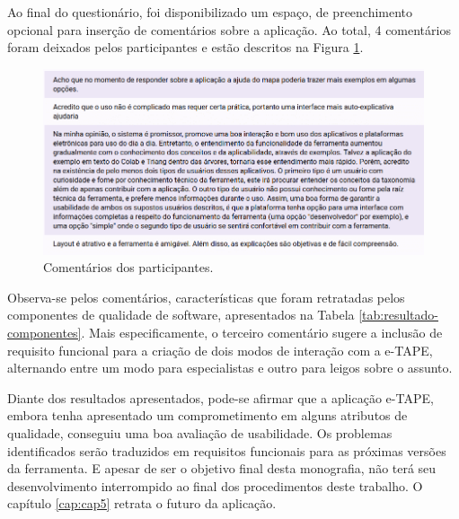 \par


Ao final do questionário, foi disponibilizado um espaço, de preenchimento opcional para  inserção de comentários sobre a aplicação. Ao total, 
4 comentários foram deixados pelos participantes e estão descritos na Figura \ref{fig:coments}.

\begin{figure}[!ht]
    \centering
    \includegraphics[scale=0.5]{./figuras/coments.png}
    \caption{Comentários dos participantes.}
    \label{fig:coments}
\end{figure}

\par
Observa-se pelos comentários, características que foram retratadas pelos componentes de qualidade de software, apresentados na Tabela \ref{tab:resultado-componentes}.
Mais especificamente, o terceiro comentário sugere a inclusão de requisito funcional para a criação de dois modos de interação com a e-TAPE, alternando entre um
modo para especialistas e outro para leigos sobre o assunto.

\par 
Diante dos resultados apresentados, pode-se afirmar que a aplicação e-TAPE, embora tenha apresentado um comprometimento em alguns atributos de qualidade,  conseguiu uma boa avaliação de usabilidade. Os problemas identificados serão traduzidos em requisitos funcionais para as próximas versões da ferramenta. E apesar de ser o objetivo final desta monografia, 
não terá seu desenvolvimento interrompido ao final dos procedimentos deste trabalho. O capítulo \ref{cap:cap5} retrata o futuro da aplicação.  
